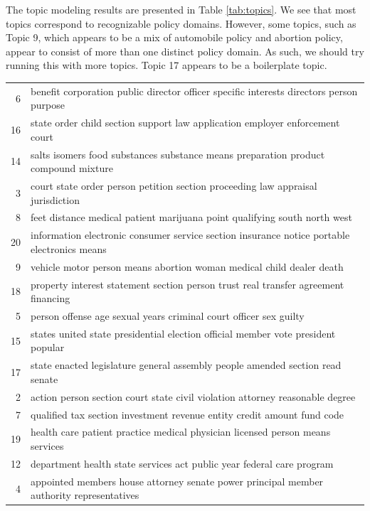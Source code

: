 \documentclass[12pt]{article} %
\begin{document}
The topic modeling results are presented in Table \ref{tab:topics}. We see that most topics correspond to recognizable policy domains. However, some topics, such as Topic 9, which appears to be a mix of automobile policy and abortion policy, appear to consist of more than one distinct policy domain. As such, we should try running this with more topics. Topic 17 appears to be a boilerplate topic. 

\begin{table}[ht]
\centering
\begin{tabular}{rl}
  \hline
  \hline
6 & benefit corporation public director officer specific interests directors person purpose \\ 
  16 & state order child section support law application employer enforcement court \\ 
  14 & salts isomers food substances substance means preparation product compound mixture \\ 
  3 & court state order person petition section proceeding law appraisal jurisdiction \\ 
  8 & feet distance medical patient marijuana point qualifying south north west \\ 
  20 & information electronic consumer service section insurance notice portable electronics means \\ 
  9 & vehicle motor person means abortion woman medical child dealer death \\ 
  18 & property interest statement section person trust real transfer agreement financing \\ 
  5 & person offense age sexual years criminal court officer sex guilty \\ 
  15 & states united state presidential election official member vote president popular \\ 
  17 & state enacted legislature general assembly people amended section read senate \\ 
  2 & action person section court state civil violation attorney reasonable degree \\ 
  7 & qualified tax section investment revenue entity credit amount fund code \\ 
  19 & health care patient practice medical physician licensed person means services \\ 
  12 & department health state services act public year federal care program \\ 
  4 & appointed members house attorney senate power principal member authority representatives \\ 

\end{tabular}
\end{table}
\end{document}
